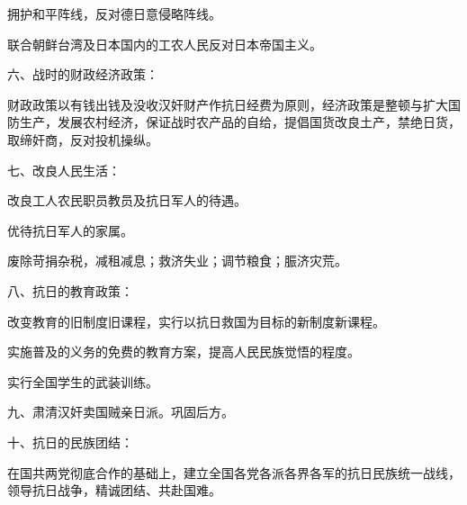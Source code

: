 拥护和平阵线，反对德日意侵略阵线。

联合朝鲜台湾及日本国内的工农人民反对日本帝国主义。

六、战时的财政经济政策：

财政政策以有钱出钱及没收汉奸财产作抗日经费为原则，经济政策是整顿与扩大国防生产，发展农村经济，保证战时农产品的自给，提倡国货改良土产，禁绝日货，取缔奸商，反对投机操纵。


七、改良人民生活：

改良工人农民职员教员及抗日军人的待遇。


优待抗日军人的家属。

废除苛捐杂税，减租减息；救济失业；调节粮食；脤济灾荒。

八、抗日的教育政策：

改变教育的旧制度旧课程，实行以抗日救国为目标的新制度新课程。

实施普及的义务的免费的教育方案，提高人民民族觉悟的程度。

实行全国学生的武装训练。

九、肃清汉奸卖国贼亲日派。巩固后方。

十、抗日的民族团结：

在国共两党彻底合作的基础上，建立全国各党各派各界各军的抗日民族统一战线，领导抗日战争，精诚团结、共赴国难。

